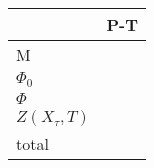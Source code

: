 \documentclass[a4paper,11pt]{article}
\numberwithin{equation}{section}
\theoremstyle{definition}
\begin{document}
\begin{tabular}{l|l}
                 & \mbox{P-T}        \\
\hline                 
M                &                   \\
\hline                 
$\Phi_0$         &                   \\
\hline                 
$\Phi$           &                   \\
\hline
$Z(X_{\tau},T)$  &                   \\
\hline
total            &                   \\
\end{tabular}




\end{document}
